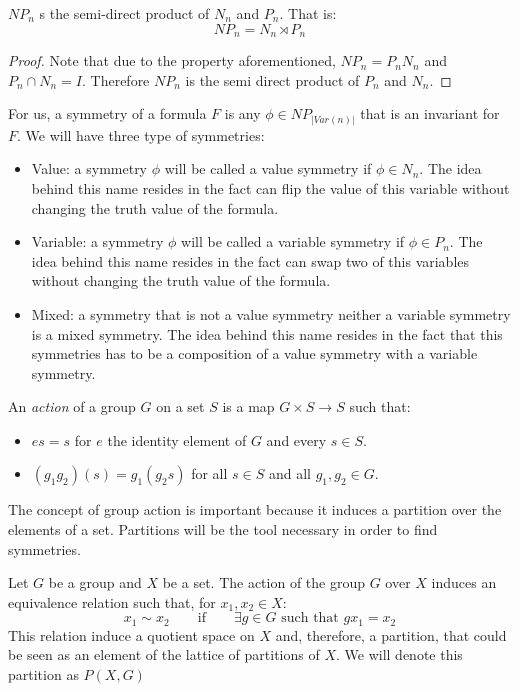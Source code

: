 \begin{proposition}
  $NP_n$ s the semi-direct product of $N_n$ and $P_n$. That is:
   $$NP_n = N_n \rtimes P_n$$
 \end{proposition}
 
\begin{proof}
Note that due to the property aforementioned, $NP_n = P_nN_n$ and $P_n\cap N_n = I$. Therefore $NP_n$ is the semi direct product of $P_n$ and $N_n$.
\end{proof}

For us, a symmetry of a formula $F$ is any $\phi\in NP_{|Var(n)|}$ that is an invariant for $F$. We will have three type of symmetries:
\begin{itemize}
\item Value: a symmetry $\phi$ will be called a value symmetry if $\phi \in N_n$. The idea behind this name resides in the fact can flip the value of this variable without changing the truth value of the formula.
\item Variable: a symmetry $\phi$ will be called a variable symmetry if $\phi \in P_n$. The idea behind this name resides in the fact can swap two of this variables without changing the truth value of the formula.
\item Mixed: a symmetry that is not a value symmetry neither a variable symmetry is a mixed symmetry. The idea behind this name resides in the fact that this symmetries has to be a composition of a value symmetry with a variable symmetry.
\end{itemize}

\begin{definition}
  An \emph{action} of a group $G$ on a set $S$ is a map $G \times S \to S$ such that:
  \begin{itemize}
  \item $es = s$ for $e$ the identity element of $G$ and every $s\in S$.
  \item $(g_1g_2)(s) = g_1(g_2s)$ for all $s \in S$ and all $g_1,g_2\in G$.
    \end{itemize}
\end{definition}


The concept of group action is important because it induces a partition over the elements of a set. Partitions will be the tool necessary in order to find symmetries.

\begin{definition}
  Let $G$ be a group and $X$ be a set. The action of the group $G$ over $X$ induces an equivalence relation such that, for $x_1,x_2 \in X$:
  $$x_1 \sim x_2 \qquad \text{if} \qquad  \exists g\in G\text{ such that } gx_1=x_2 $$
  This relation induce a quotient space on $X$ and, therefore, a partition, that could be seen as an element of the lattice of partitions of $X$. We will denote this partition as $P(X,G)$
\end{definition}

